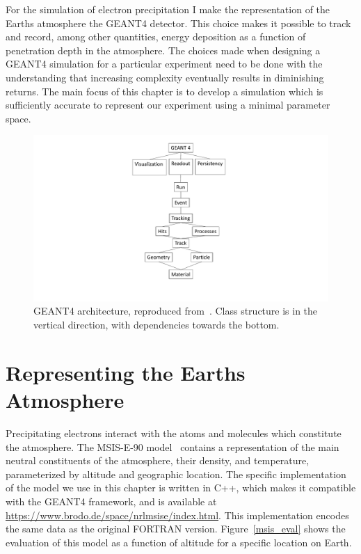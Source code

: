 For the simulation of electron precipitation I make the representation of the Earths atmosphere the GEANT4 detector. This choice makes it possible to track and record, among other quantities, energy deposition as a function of penetration depth in the atmosphere. The choices made when designing a GEANT4 simulation for a particular experiment need to be done with the understanding that increasing complexity eventually results in diminishing returns. The main focus of this chapter is to develop a simulation which is sufficiently accurate to represent our experiment using a minimal parameter space. 

\begin{figure}[p]
\label{GEANT4-structure}
\hspace{-6cm}
\includegraphics[width=1.7\textwidth]{figures/chapter_3/GEANT4-structure/GEANT4-structure}
\caption{GEANT4 architecture, reproduced from~\citet{Pfeier:519005}. Class structure is in the vertical direction, with dependencies towards the bottom.}
\end{figure}

\section{Representing the Earths Atmosphere}

Precipitating electrons interact with the atoms and molecules which constitute the atmosphere. The MSIS-E-90 model~\citep{Picone2002} contains a representation of the main neutral constituents of the atmosphere, their density, and temperature, parameterized by altitude and geographic location. The specific implementation of the model we use in this chapter is written in C++, which makes it compatible with the GEANT4 framework, and is available at \url{https://www.brodo.de/space/nrlmsise/index.html}. This implementation encodes the same data as the original FORTRAN version. Figure~\ref{msis_eval} shows the evaluation of this model as a function of altitude for a specific location on Earth. 

